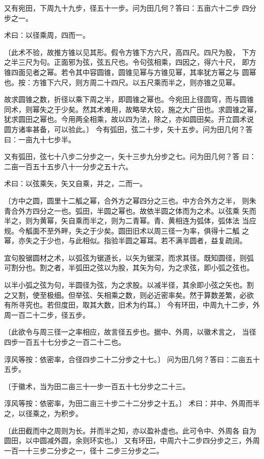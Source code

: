 \documentclass[12pt,UTF8]{ctexbook}
\begin{document}
又有宛田，下周九十九步，径五十一步。问为田几何？答曰：五亩六十二步 四分步之一。

术曰：以径乘周，四而一。

〔此术不验，故推方锥以见其形。假令方锥下方六尺，高四尺。四尺为股， 下方之半三尺为句。正面邪为弦，弦五尺也。令句弦相乘，四因之，得六十尺， 即方锥四面见者之幂。若令其中容圆锥，圆锥见幂与方锥见幂，其率犹方幂之与 圆幂也。按：方锥下六尺，则方周二十四尺。以五尺乘而半之，则亦锥之见幂。

故求圆锥之数，折径以乘下周之半，即圆锥之幂也。今宛田上径圆穹，而与圆锥 同术，则幂失之于少矣。然其术难用，故略举大较，施之大广田也。求圆锥之幂， 犹求圆田之幂也。今用两全相乘，故以四为法，除之，亦如圆田矣。开立圆术说 圆方诸率甚备，可以验此。〕 今有弧田，弦二十步，矢十五步。问为田几何？答曰：一亩九十七步半。

又有弧田，弦七十八步二分步之一，矢十三步九分步之七。问为田几何？答 曰：二亩一百五十五步八十一分步之五十六。

术曰：以弦乘矢，矢又自乘，并之，二而一。

〔方中之圆，圆里十二觚之幂，合外方之幂四分之三也。中方合外方之半， 则朱青合外方四分之一也。弧田，半圆之幂也。故依半圆之体而为之术。以弦乘 矢而半之，则为黄幂，矢自乘而半之，则为二青幂。青、黄相连为弧体，弧体法 当应规。今觚面不至外畔，失之于少矣。圆田旧术以周三径一为率，俱得十二觚 之幂，亦失之于少也，与此相似。指验半圆之幂耳。若不满半圆者，益复疏阔。

宜句股锯圆材之术，以弧弦为锯道长，以矢为锯深，而求其径。既知圆径，则弧 可割分也。割之者，半弧田之弦以为股，其矢为句，为之求弦，即小弧之弦也。

以半小弧之弦为句，半圆径为弦，为之求股。以减半径，其余即小弦之矢也。割 之又割，使至极细。但举弦、矢相乘之数，则必近密率矣。然于算数差繁，必欲 有所寻究也。若但度田，取其大数，旧术为约耳。〕 今有环田，中周九十二步，外周一百二十二步，径五步。

〔此欲令与周三径一之率相应，故言径五步也。据中、外周，以徽术言之， 当径四步一百五十七分步之一百二十二也。

淳风等按：依密率，合径四步二十二分步之十七。〕 问为田几何？答曰：二亩五十五步。

〔于徽术，当为田二亩三十一步一百五十七分步之二十三。

淳风等按：依密率，为田二亩三十步二十二分步之十五。〕 术曰：并中、外周而半之，以径乘之，为积步。

〔此田截而中之周则为长。并而半之知，亦以盈补虚也。此可令中、外周各 自为圆田，以中圆减外圆，余则环实也。〕 又有环田，中周六十二步四分步之三，外周一百一十三步二分步之一，径十 二步三分步之二。
\end{document}
